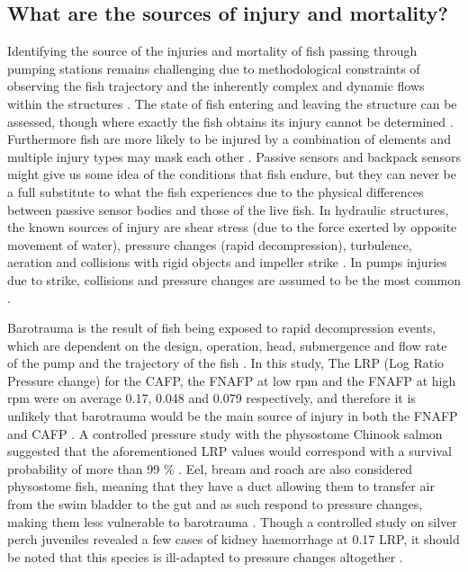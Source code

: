 \documentclass[fleqn,10pt]{wlscirep}
\begin{document}
\subsection*{What are the sources of injury and mortality?}
Identifying the source of the injuries and mortality of fish passing through pumping stations remains challenging due to methodological constraints of observing the fish trajectory and the inherently complex and dynamic flows within the structures \cite{Koukouvinis2023StateIndicators}. The state of fish entering and leaving the structure can be assessed, though where exactly the fish obtains its injury cannot be determined \cite{Cox2023FishReview}. Furthermore fish are more likely to be injured by a combination of elements and multiple injury types may mask each other \cite{Yang2022EffectsPump}. Passive sensors and backpack sensors might give us some idea of the conditions that fish endure, but they can never be a full substitute to what the fish experiences due to the physical differences between passive sensor bodies and those of the live fish. In hydraulic structures, the known sources of injury are shear stress (due to the force exerted by opposite movement of water), pressure changes (rapid decompression), turbulence, aeration and collisions with rigid objects and impeller strike \cite{Cox2023FishReview}. In pumps injuries due to strike, collisions and pressure changes are assumed to be the most common \cite{Cada1997DevelopmentTurbines,VanEsch2012FishStations}.

Barotrauma is the result of fish being exposed to rapid decompression events, which are dependent on the design, operation, head, submergence and flow rate of the pump and the trajectory of the fish \cite{Brown2014UnderstandingResources}. In this study, The LRP (Log Ratio Pressure change) for the CAFP, the FNAFP at low rpm and the FNAFP at high rpm were on average 0.17, 0.048 and 0.079 respectively, and therefore it is unlikely that barotrauma would be the main source of injury in both the FNAFP and CAFP \cite{Brown2012QuantifyingPassage}. A controlled pressure study with the physostome Chinook salmon suggested that the aforementioned LRP values would correspond with a survival probability of more than 99 \% \cite{Brown2012QuantifyingPassage}. Eel, bream and roach are also considered physostome fish, meaning that they have a duct allowing them to transfer air from the swim bladder to the gut and as such respond to pressure changes, making them less vulnerable to barotrauma \cite{Pavlov2003AdaptationalPressure}. Though a controlled study on silver perch juveniles revealed a few cases of kidney haemorrhage at 0.17 LRP, it should be noted that this species is ill-adapted to pressure changes altogether \cite{Boys2014DownstreamBasin}. 
\end{document}
